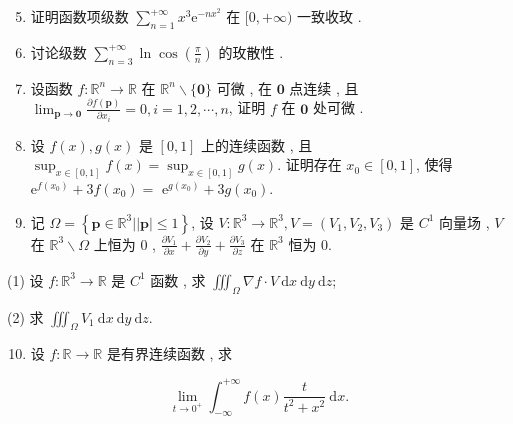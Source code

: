 \documentclass[10pt]{article}
\begin{document}
\begin{enumerate}
  \setcounter{enumi}{4}
  \item  证明函数项级数  $\sum_{n=1}^{+\infty} x^{3} \mathrm{e}^{-n x^{2}}$  在  $[0,+\infty)$  一致收玫 .

  \item  讨论级数  $\sum_{n=3}^{+\infty} \ln \cos \left(\frac{\pi}{n}\right)$  的玫散性 .

  \item  设函数  $f: \mathbb{R}^{n} \rightarrow \mathbb{R}$  在  $\mathbb{R}^{n} \backslash\{\mathbf{0}\}$  可微 ,  在  $\mathbf{0}$  点连续 ,  且  $\lim _{\mathbf{p} \rightarrow \mathbf{0}} \frac{\partial f(\mathbf{p})}{\partial x_{i}}=0, i=1,2, \cdots, n$,  证明  $f$  在  $\mathbf{0}$  处可微 .

  \item  设  $f(x), g(x)$  是  $[0,1]$  上的连续函数 ,  且  $\sup _{x \in[0,1]} f(x)=\sup _{x \in[0,1]} g(x)$.  证明存在  $x_{0} \in[0,1]$,  使得  $\mathrm{e}^{f\left(x_{0}\right)}+3 f\left(x_{0}\right)=$ $\mathrm{e}^{g\left(x_{0}\right)}+3 g\left(x_{0}\right) .$

  \item  记  $\Omega=\left\{\mathbf{p} \in \mathbb{R}^{3}|| \mathbf{p} \mid \leq 1\right\}$,  设  $V: \mathbb{R}^{3} \rightarrow \mathbb{R}^{3}, V=\left(V_{1}, V_{2}, V_{3}\right)$  是  $C^{1}$  向量场 , $V$  在  $\mathbb{R}^{3} \backslash \Omega$  上恒为  0 , $\frac{\partial V_{1}}{\partial x}+\frac{\partial V_{2}}{\partial y}+\frac{\partial V_{3}}{\partial z}$  在  $\mathbb{R}^{3}$  恒为  $0 .$

\end{enumerate}
(1)  设  $f: \mathbb{R}^{3} \rightarrow \mathbb{R}$  是  $C^{1}$  函数 ,  求  $\iiint_{\Omega} \nabla f \cdot V \mathrm{~d} x \mathrm{~d} y \mathrm{~d} z$;

(2)  求  $\iiint_{\Omega} V_{1} \mathrm{~d} x \mathrm{~d} y \mathrm{~d} z$.

\begin{enumerate}
  \setcounter{enumi}{9}
  \item  设  $f: \mathbb{R} \rightarrow \mathbb{R}$  是有界连续函数 ,  求 
\end{enumerate}
$$
\lim _{t \rightarrow 0^{+}} \int_{-\infty}^{+\infty} f(x) \frac{t}{t^{2}+x^{2}} \mathrm{~d} x .
$$
\end{document}
